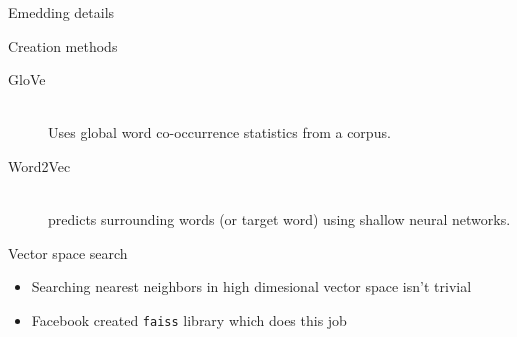 \documentclass[aspectratio=169]{beamer}
\begin{document}
\begin{frame}{Emedding details}
  \begin{block}{Creation methods}
  \begin{description}
    \item[GloVe]\hfill \\ Uses global word co-occurrence statistics from a corpus.
    \item[Word2Vec]\hfill \\predicts surrounding words (or target word) using shallow neural networks.
  \end{description}
  \end{block}
  \begin{block}{Vector space search}
  \begin{itemize}
    \item Searching nearest neighbors in high dimesional vector space isn't  trivial
    \item Facebook created \texttt{faiss} library which does this job
  \end{itemize}
  \end{block}
\end{frame}
\end{document}
